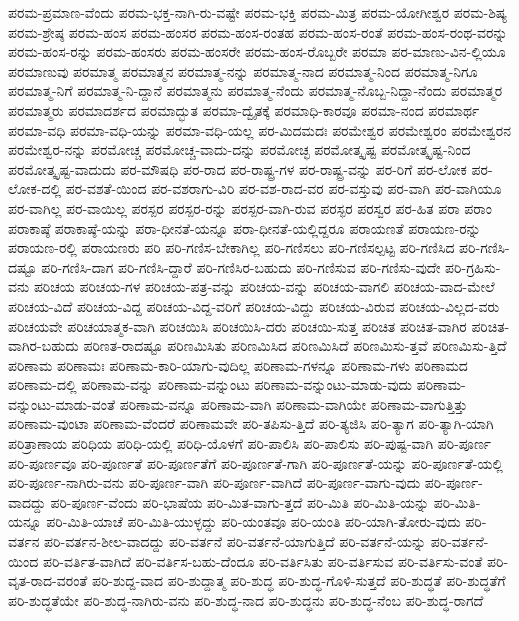 {ಪರಮ-ಪ್ರಮಾಣ-ವೆಂದು
ಪರಮ-ಭಕ್ತ-ನಾಗಿ-ರು-ವಷ್ಟೇ
ಪರಮ-ಭಕ್ತಿ
ಪರಮ-ಮಿತ್ರ
ಪರಮ-ಯೋಗೀಶ್ವರ
ಪರಮ-ಶಿಷ್ಯ
ಪರಮ-ಶ್ರೇಷ್ಠ
ಪರಮ-ಹಂಸ
ಪರಮ-ಹಂಸರ
ಪರಮ-ಹಂಸ-ರಂತಹ
ಪರಮ-ಹಂಸ-ರಂತೆ
ಪರಮ-ಹಂಸ-ರಂಥ-ವರನ್ನು
ಪರಮ-ಹಂಸ-ರನ್ನು
ಪರಮ-ಹಂಸರು
ಪರಮ-ಹಂಸರೇ
ಪರಮ-ಹಂಸ-ರೊಬ್ಬರೇ
ಪರಮಾ
ಪರ-ಮಾಣು-ವಿನ-ಲ್ಲಿಯೂ
ಪರಮಾಣುವು
ಪರಮಾತ್ಮ
ಪರಮಾತ್ಮನ
ಪರಮಾತ್ಮ-ನನ್ನು
ಪರಮಾತ್ಮ-ನಾದ
ಪರಮಾತ್ಮ-ನಿಂದ
ಪರಮಾತ್ಮ-ನಿಗೂ
ಪರಮಾತ್ಮ-ನಿಗೆ
ಪರಮಾತ್ಮ-ನಿ-ದ್ದಾನೆ
ಪರಮಾತ್ಮನು
ಪರಮಾತ್ಮ-ನೆಂದು
ಪರಮಾತ್ಮ-ನೊಬ್ಬ-ನಿದ್ದಾ-ನೆಂದು
ಪರಮಾತ್ಮರ
ಪರಮಾತ್ಮರು
ಪರಮಾದರ್ಶದ
ಪರಮಾದ್ಭುತ
ಪರಮಾ-ದ್ವೈತಕ್ಕೆ
ಪರಮಾಧಿ-ಕಾರವೂ
ಪರಮಾ-ನಂದ
ಪರಮಾರ್ಥ
ಪರಮಾ-ವಧಿ
ಪರಮಾ-ವಧಿ-ಯನ್ನು
ಪರಮಾ-ವಧಿ-ಯಲ್ಲ
ಪರ-ಮಿದಮದಃ
ಪರಮೇಶ್ವರ
ಪರಮೇಶ್ವರಂ
ಪರಮೇಶ್ವರನ
ಪರಮೇಶ್ವರ-ನನ್ನು
ಪರಮೋಚ್ಚ
ಪರಮೋಚ್ಚ-ವಾದು-ದನ್ನು
ಪರಮೋಚ್ಛ
ಪರಮೋತ್ಕೃಷ್ಟ
ಪರಮೋತ್ಕೃಷ್ಟ-ನಿಂದ
ಪರಮೋತ್ಕೃಷ್ಟ-ವಾದುದು
ಪರ-ಮೌಷಧಿ
ಪರ-ರಾದ
ಪರ-ರಾಷ್ಟ್ರ-ಗಳ
ಪರ-ರಾಷ್ಟ್ರ-ವನ್ನು
ಪರ-ರಿಗೆ
ಪರ-ಲೋಕ
ಪರ-ಲೋಕ-ದಲ್ಲಿ
ಪರ-ವಶತೆ-ಯಿಂದ
ಪರ-ವಶರಾಗು-ವಿರಿ
ಪರ-ವಶ-ರಾದ-ವರ
ಪರ-ವಸ್ತುವು
ಪರ-ವಾಗಿ
ಪರ-ವಾಗಿಯೂ
ಪರ-ವಾಗಿಲ್ಲ
ಪರ-ವಾಯಿಲ್ಲ
ಪರಸ್ಪರ
ಪರಸ್ಪರ-ರನ್ನು
ಪರಸ್ಪರ-ವಾಗಿ-ರುವ
ಪರಸ್ಫರ
ಪರಸ್ವರ
ಪರ-ಹಿತ
ಪರಾ
ಪರಾಂ
ಪರಾಕಾಷ್ಠೆ
ಪರಾಕಾಷ್ಠೆ-ಯನ್ನು
ಪರಾ-ಧೀನತೆ-ಯನ್ನೂ
ಪರಾ-ಧೀನತೆ-ಯಲ್ಲಿದ್ದರೂ
ಪರಾಯಣತೆ
ಪರಾಯಣ-ರನ್ನು
ಪರಾಯಣ-ರಲ್ಲಿ
ಪರಾಯಣರು
ಪರಿ
ಪರಿ-ಗಣಿಸ-ಬೇಕಾಗಿಲ್ಲ
ಪರಿ-ಗಣಿಸಲು
ಪರಿ-ಗಣಿಸಲ್ಪಟ್ಟ
ಪರಿ-ಗಣಿಸಿದ
ಪರಿ-ಗಣಿಸಿ-ದಷ್ಟೂ
ಪರಿ-ಗಣಿಸಿ-ದಾಗ
ಪರಿ-ಗಣಿಸಿ-ದ್ದಾರೆ
ಪರಿ-ಗಣಿಸಿರ-ಬಹುದು
ಪರಿ-ಗಣಿಸುವ
ಪರಿ-ಗಣಿಸು-ವುದೇ
ಪರಿ-ಗ್ರಹಿಸು-ವನು
ಪರಿಚಯ
ಪರಿಚಯ-ಗಳ
ಪರಿಚಯ-ಪತ್ರ-ವನ್ನು
ಪರಿಚಯ-ವನ್ನು
ಪರಿಚಯ-ವಾಗಲಿ
ಪರಿಚಯ-ವಾದ-ಮೇಲೆ
ಪರಿಚಯ-ವಿದೆ
ಪರಿಚಯ-ವಿದ್ದ
ಪರಿಚಯ-ವಿದ್ದ-ವರಿಗೆ
ಪರಿಚಯ-ವಿದ್ದು
ಪರಿಚಯ-ವಿರುವ
ಪರಿಚಯ-ವಿಲ್ಲದ-ವರು
ಪರಿಚಯವೇ
ಪರಿಚಯಾತ್ಮಕ-ವಾಗಿ
ಪರಿಚಯಿಸಿ
ಪರಿಚಯಿಸಿ-ದರು
ಪರಿಚಯಿ-ಸುತ್ತ
ಪರಿಚಿತ
ಪರಿಚಿತ-ವಾಗಿರ
ಪರಿಚಿತ-ವಾಗಿರ-ಬಹುದು
ಪರಿಣತ-ರಾದಷ್ಟೂ
ಪರಿಣಮಿಸಿತು
ಪರಿಣಮಿಸಿದ
ಪರಿಣಮಿಸಿದೆ
ಪರಿಣಮಿಸು-ತ್ತವೆ
ಪರಿಣಮಿಸು-ತ್ತಿದೆ
ಪರಿಣಾಮ
ಪರಿಣಾಮಃ
ಪರಿಣಾಮ-ಕಾರಿ-ಯಾಗು-ವುದಿಲ್ಲ
ಪರಿಣಾಮ-ಗಳನ್ನೂ
ಪರಿಣಾಮ-ಗಳು
ಪರಿಣಾಮದ
ಪರಿಣಾಮ-ದಲ್ಲಿ
ಪರಿಣಾಮ-ವನ್ನು
ಪರಿಣಾಮ-ವನ್ನುಂಟು
ಪರಿಣಾಮ-ವನ್ನುಂಟು-ಮಾಡು-ವುದು
ಪರಿಣಾಮ-ವನ್ನುಂಟು-ಮಾಡು-ವಂತೆ
ಪರಿಣಾಮ-ವನ್ನೂ
ಪರಿಣಾಮ-ವಾಗಿ
ಪರಿಣಾಮ-ವಾಗಿಯೇ
ಪರಿಣಾಮ-ವಾಗುತ್ತಿತ್ತು
ಪರಿಣಾಮ-ವುಂಟಾ
ಪರಿಣಾಮ-ವೆಂದರೆ
ಪರಿಣಾಮವೇ
ಪರಿ-ತಪಿಸು-ತ್ತಿದೆ
ಪರಿ-ತ್ಯಜಿಸಿ
ಪರಿ-ತ್ಯಾಗ
ಪರಿ-ತ್ಯಾಗಿ-ಯಾಗಿ
ಪರಿತ್ರಾಣಾಯ
ಪರಿಧಿಯ
ಪರಿಧಿ-ಯಲ್ಲಿ
ಪರಿಧಿ-ಯೊಳಗೆ
ಪರಿ-ಪಾಲಿಸಿ
ಪರಿ-ಪಾಲಿಸು
ಪರಿ-ಪುಷ್ಟ-ವಾಗಿ
ಪರಿ-ಪೂರ್ಣ
ಪರಿ-ಪೂರ್ಣವೂ
ಪರಿ-ಪೂರ್ಣತೆ
ಪರಿ-ಪೂರ್ಣತೆಗೆ
ಪರಿ-ಪೂರ್ಣತೆ-ಗಾಗಿ
ಪರಿ-ಪೂರ್ಣತೆ-ಯನ್ನು
ಪರಿ-ಪೂರ್ಣತೆ-ಯಲ್ಲಿ
ಪರಿ-ಪೂರ್ಣ-ನಾಗಿರು-ವನು
ಪರಿ-ಪೂರ್ಣ-ವಾಗಿ
ಪರಿ-ಪೂರ್ಣ-ವಾಗಿದೆ
ಪರಿ-ಪೂರ್ಣ-ವಾಗು-ವುದು
ಪರಿ-ಪೂರ್ಣ-ವಾದದ್ದು
ಪರಿ-ಪೂರ್ಣ-ವೆಂದು
ಪರಿ-ಭಾಷೆಯ
ಪರಿ-ಮಿತ-ವಾಗು-ತ್ತದೆ
ಪರಿ-ಮಿತಿ
ಪರಿ-ಮಿತಿ-ಯನ್ನು
ಪರಿ-ಮಿತಿ-ಯನ್ನೂ
ಪರಿ-ಮಿತಿ-ಯಾಚೆ
ಪರಿ-ಮಿತಿ-ಯುಳ್ಳದ್ದು
ಪರಿ-ಯಂತವೂ
ಪರಿ-ಯಂತಿ
ಪರಿ-ಯಾಗಿ-ತೋರು-ವುದು
ಪರಿ-ವರ್ತನ
ಪರಿ-ವರ್ತನ-ಶೀಲ-ವಾದದ್ದು
ಪರಿ-ವರ್ತನೆ
ಪರಿ-ವರ್ತನೆ-ಯಾಗುತ್ತಿದೆ
ಪರಿ-ವರ್ತನೆ-ಯನ್ನು
ಪರಿ-ವರ್ತನೆ-ಯಿಂದ
ಪರಿ-ವರ್ತಿತ-ವಾಗಿದೆ
ಪರಿ-ವರ್ತಿಸ-ಬಹು-ದೆಂದೂ
ಪರಿ-ವರ್ತಿಸಿತು
ಪರಿ-ವರ್ತಿಸುವ
ಪರಿ-ವರ್ತಿಸು-ವಂತೆ
ಪರಿ-ವೃತ-ರಾದ-ವರಂತೆ
ಪರಿ-ಶುದ್ದ-ವಾದ
ಪರಿ-ಶುದ್ದಾತ್ಮ
ಪರಿ-ಶುದ್ಧ
ಪರಿ-ಶುದ್ಧ-ಗೊಳಿ-ಸುತ್ತದೆ
ಪರಿ-ಶುದ್ಧತೆ
ಪರಿ-ಶುದ್ಧತೆಗೆ
ಪರಿ-ಶುದ್ಧತೆಯೇ
ಪರಿ-ಶುದ್ಧ-ನಾಗಿರು-ವನು
ಪರಿ-ಶುದ್ಧ-ನಾದ
ಪರಿ-ಶುದ್ಧನು
ಪರಿ-ಶುದ್ಧ-ನೆಂಬ
ಪರಿ-ಶುದ್ಧ-ರಾಗದೆ
}
